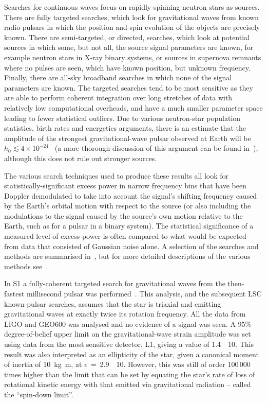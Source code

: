 Searches for continuous waves focus on rapidly-spinning neutron stars as sources. There are fully targeted 
searches, which look for gravitational waves from known radio pulsars in which the position and spin 
evolution of the objects are precisely known. There are semi-targeted, or directed, searches, which look at 
potential sources in which some, but not all, the source signal parameters are known, for example neutron 
stars in X-ray binary systems, or sources in supernova remnants where no pulses are seen, which have known 
position, but unknown frequency. Finally, there are all-sky broadband searches in which none of the signal 
parameters are known. The targeted searches tend to be most sensitive as they are able to perform coherent 
integration over long stretches of data with relatively low computational overheads, and have a much smaller 
parameter space leading to fewer statistical outliers. Due to various neutron-star population statistics, 
birth rates and energetics arguments, there is an estimate that the amplitude of the strongest 
gravitational-wave pulsar observed at Earth will be $h_0 \lesssim 4\times10^{-24}$~\cite{Abbott:2007a} (a more 
thorough discussion of this argument can be found in~\cite{Knispel:2008}), although this does not rule out 
stronger sources.

The various search techniques used to produce these results all look for statistically-significant excess 
power in narrow frequency bins that have been Doppler demodulated to take into account the signal's shifting 
frequency caused by the Earth's orbital motion with respect to the source (or also including the modulations 
to the signal caused by the source's own motion relative to the Earth, such as for a pulsar in a binary 
system). The statistical significance of a measured level of excess power is often compared to what would be 
expected from data that consisted of Gaussian noise alone. A selection of the searches and methods are
summarised in~\cite{Prix:2006}, but for more detailed descriptions of the various methods 
see~\cite{Brady:2000, Krishnan:2004, Jaranowski:1998, Abbott:2008e, Abbott:2007a, Dupuis:2005}.

In S1 a fully-coherent targeted search for gravitational waves from the then-fastest millisecond pulsar 
 was performed~\cite{Abbott:2004d}. This analysis, and the subsequent LSC 
known-pulsar searches, assumes that the star is triaxial and emitting gravitational waves at exactly twice its 
rotation frequency. All the data from LIGO and GEO600 was analysed and no evidence of a signal was seen. A 
95\% degree-of-belief upper limit on the gravitational-wave strain amplitude was set using data from the most 
sensitive detector, L1, giving a value of 1.4~\texttimes~10. This result was also interpreted as an 
ellipticity of the star, given a canonical moment of inertia of 10~kg~m, at 
$\epsilon$~=~2.9~\texttimes~10.  However, this was still of order 100\,000 times higher than the 
limit that can be set by equating the star's rate of loss of rotational kinetic energy with that emitted
via gravitational radiation -- called the ``spin-down limit''.

